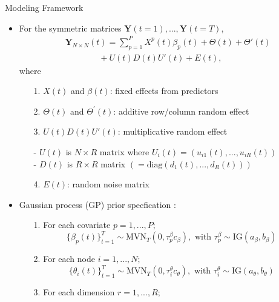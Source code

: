 \documentclass[serif,mathserif,final,table]{beamer}
\begin{document}
\begin{frame}{}
\begin{columns}[t]
    
    \begin{column}{0.235\linewidth}
           \begin{block}{Modeling Framework}
           	\begin{itemize}
           		\item For the symmetric matrices $\boldsymbol{Y}(t=1),...,\boldsymbol{Y}(t=T)$,
            \begin{equation*}
            \begin{aligned}
            &\boldsymbol{Y}_{N\times N}(t)=\sum_{p=1}^PX^p(t)\beta_p(t)+\Theta(t)+\Theta'(t)\\&\quad\quad\quad\quad+U(t)D(t)U'(t)+E(t), 
            \end{aligned}
            \end{equation*}
            where 
            \begin{enumerate}
            	\item[1.] $X(t)$ and $\beta(t)$: fixed effects from predictors
            	\item[2.] $\Theta(t)$ and $\Theta^\prime(t)$: additive row/column random effect
            	\item[3.] $U(t)D(t)U'(t)$: multiplicative random effect
            	\begin{tabbing}
            		- $U(t)$ is $N \times R$ matrix where $U_i(t) =(u_{i1}(t),...,u_{iR}(t))$ \\
            	- $D(t)$ is $R \times R$ matrix $(=\mbox{diag}(d_1(t),...,d_R(t)))$
            	\end{tabbing}
            	\item[4.] $E(t)$: random noise matrix
            \end{enumerate} 
            \vspace{10pt}
            \item Gaussian process (GP) prior specfication \cite{durante2014nonparametric}:
            \begin{enumerate}
         	\item[1.] For each covariate $p=1,...,P;$ $$\{\beta_{p}(t)\}_{t=1}^T\sim \mbox{MVN}_{T}(0, \tau^{\beta}_pc_\beta), \mbox{ with }\tau^{\beta}_p \sim \mbox{IG}(a_\beta, b_\beta)$$
         	\item[2.] For each node $i=1,...,N;$
         	$$\{\theta_{i}(t)\}_{t=1}^T \sim \mbox{MVN}_{T}(0, \tau^{\theta}_ic_\theta), \mbox{ with } \tau^{\theta}_i \sim \mbox{IG}(a_\theta, b_\theta)$$
         	\item[3.] For each dimension $r=1,...,R;$

\end{enumerate}
\end{itemize}
\end{block}
\end{column}
\end{columns}
\end{frame}
\end{document}
